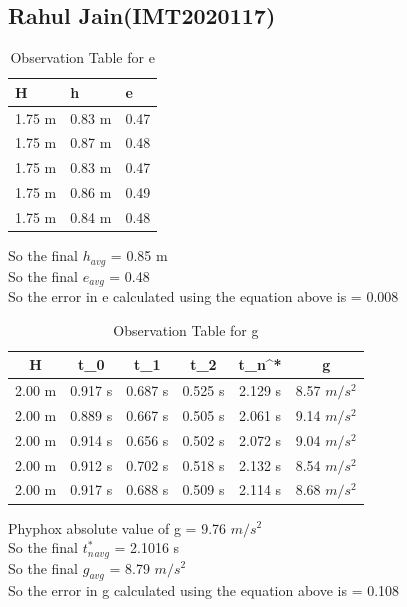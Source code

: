 \documentclass[11pt]{scrartcl} %
\begin{document}
\newpage
\subsection{Rahul Jain(IMT2020117)}

\begin{table}[h] %
	\centering %
	\begin{tabular}{l l l}
		\toprule
		\textbf{H} & \textbf{h} & \textbf{e} \\
		\midrule
		1.75 m & 0.83 m & 0.47\\
        1.75 m & 0.87 m  & 0.48\\
        1.75 m & 0.83 m  & 0.47\\
        1.75 m & 0.86 m & 0.49 \\
        1.75 m & 0.84 m & 0.48 \\
		\bottomrule
	\end{tabular}
	\caption{Observation Table for e}
\end{table}
So the final $h_{avg}$ = 0.85 m\\
So the final $e_{avg}$ = 0.48\\
So the error in e calculated using the equation above is  = 0.008

\begin{table}[h]
\centering
\begin{tabular}{||c c c c c c||} 
\toprule
 \hline
 H & t_0 & t_1 & t_2 & t_n^* & g \\ [0.5ex] 
 \midrule
 \hline\hline
 2.00 m & 0.917 s & 0.687 s  & 0.525 s & 2.129 s & 8.57 $m/s^2$  \\ 
 \hline
 2.00 m & 0.889 s & 0.667 s & 0.505 s & 2.061 s & 9.14 $m/s^2$  \\
 \hline 
 2.00 m & 0.914 s & 0.656 s & 0.502 s & 2.072 s  & 9.04 $m/s^2$   \\
 \hline
 2.00 m & 0.912 s & 0.702 s & 0.518 s & 2.132 s  & 8.54 $m/s^2$   \\
 \hline
 2.00 m & 0.917 s & 0.688 s & 0.509 s & 2.114 s  & 8.68 $m/s^2$  \\ 
 [1ex]
 \bottomrule
 \hline
\end{tabular}
\caption{Observation Table for g}
\end{table}
Phyphox absolute value of g = 9.76 $m/s^2$\\
So the final $t_n^*_{avg}$ = 2.1016 s\\
So the final $g_{avg}$ = 8.79 $m/s^2$\\
So the error in g calculated using the equation above is  = 0.108  \\
\end{document}
